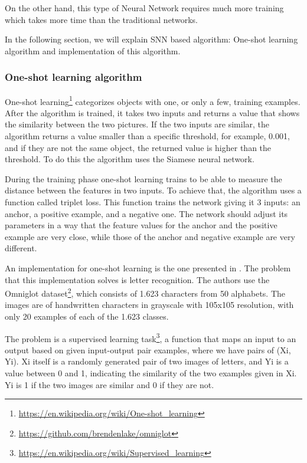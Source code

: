On the other hand, this type of Neural Network requires much more training which takes more time than the traditional networks.

In the following section, we will explain SNN based algorithm: One-shot learning algorithm and implementation of this algorithm.  

\subsubsection{One-shot learning algorithm}
\label{One-shot learning algorithm state of the art}

One-shot learning\footnote{\href{https://en.wikipedia.org/wiki/One-shot_learning}{https://en.wikipedia.org/wiki/One-shot\_learning}} categorizes objects with one, or only a few, training examples. After the algorithm is trained, it takes two inputs and returns a value that shows the similarity between the two pictures. If the two inputs are similar, the algorithm returns a value smaller than a specific threshold, for example, 0.001, and if they are not the same object, the returned value is higher than the threshold. To do this the algorithm uses the Siamese neural network.

During the training phase one-shot learning trains to be able to measure the distance between the features in two inputs. To achieve that, the algorithm uses a function called triplet loss. This function trains the network giving it 3 inputs: an anchor, a positive example, and a negative one. The network should adjust its parameters in a way that the feature values for the anchor and the positive example are very close, while those of the anchor and negative example are very different.

An implementation for one-shot learning is the one presented in \citep{oneShot}. The problem that this implementation solves is letter recognition. The authors use the Omniglot dataset\footnote{\href{https://github.com/brendenlake/omniglot}{https://github.com/brendenlake/omniglot}}, which consists of 1.623 characters from 50 alphabets. The images are of handwritten characters in grayscale with 105x105 resolution, with only 20 examples of each of the 1.623 classes.

The problem is a supervised learning task\footnote{\href{https://en.wikipedia.org/wiki/Supervised_learning}{https://en.wikipedia.org/wiki/Supervised\_learning}}, a function that maps an input to an output based on given input-output pair examples, where we have pairs of (Xi, Yi). Xi itself is a randomly generated pair of two images of letters, and Yi is a value between 0 and 1, indicating the similarity of the two examples given in Xi. Yi is 1 if the two images are similar and 0 if they are not.

